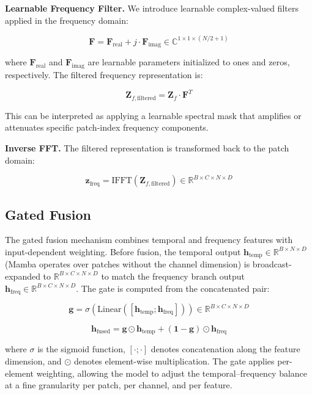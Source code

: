 \documentclass[electronics,article,submit,pdftex,moreauthors]{Definitions/mdpi}
\begin{document}
\textbf{Learnable Frequency Filter.} We introduce learnable complex-valued filters applied in the frequency domain:
\begin{linenomath}
\begin{equation}
\mathbf{F} = \mathbf{F}_{\text{real}} + j \cdot \mathbf{F}_{\text{imag}} \in \mathbb{C}^{1 \times 1 \times (N/2+1)}
\end{equation}
\end{linenomath}
where $\mathbf{F}_{\text{real}}$ and $\mathbf{F}_{\text{imag}}$ are learnable parameters initialized to ones and zeros, respectively. The filtered frequency representation is:
\begin{linenomath}
\begin{equation}
\mathbf{Z}_{f,\text{filtered}} = \mathbf{Z}_f \cdot \mathbf{F}^T
\end{equation}
\end{linenomath}
This can be interpreted as applying a learnable spectral mask that amplifies or attenuates specific patch-index frequency components.

\textbf{Inverse FFT.} The filtered representation is transformed back to the patch domain:
\begin{linenomath}
\begin{equation}
\mathbf{z}_{\text{freq}} = \text{IFFT}(\mathbf{Z}_{f,\text{filtered}}) \in \mathbb{R}^{B \times C \times N \times D}
\end{equation}
\end{linenomath}

\subsection{Gated Fusion}

The gated fusion mechanism combines temporal and frequency features with input-dependent weighting. Before fusion, the temporal output $\mathbf{h}_{\text{temp}} \in \mathbb{R}^{B \times N \times D}$ (Mamba operates over patches without the channel dimension) is broadcast-expanded to $\mathbb{R}^{B \times C \times N \times D}$ to match the frequency branch output $\mathbf{h}_{\text{freq}} \in \mathbb{R}^{B \times C \times N \times D}$. The gate is computed from the concatenated pair:
\begin{linenomath}
\begin{equation}
\mathbf{g} = \sigma(\text{Linear}([\mathbf{h}_{\text{temp}}; \mathbf{h}_{\text{freq}}])) \in \mathbb{R}^{B \times C \times N \times D}
\end{equation}
\end{linenomath}
\begin{linenomath}
\begin{equation}
\mathbf{h}_{\text{fused}} = \mathbf{g} \odot \mathbf{h}_{\text{temp}} + (\mathbf{1} - \mathbf{g}) \odot \mathbf{h}_{\text{freq}}
\end{equation}
\end{linenomath}
where $\sigma$ is the sigmoid function, $[\cdot;\cdot]$ denotes concatenation along the feature dimension, and $\odot$ denotes element-wise multiplication. The gate applies per-element weighting, allowing the model to adjust the temporal--frequency balance at a fine granularity per patch, per channel, and per feature.
\end{document}
